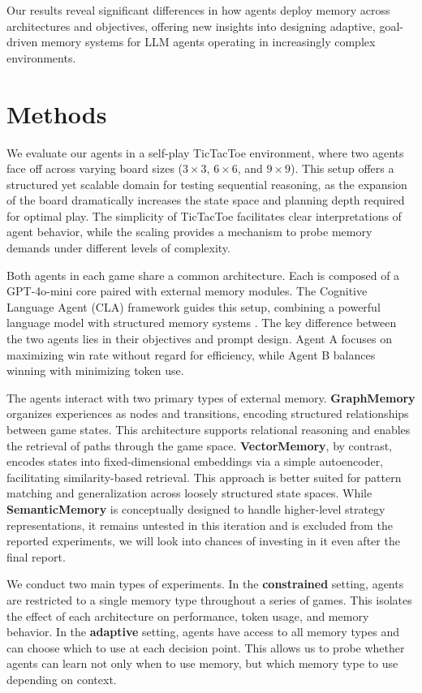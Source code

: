 \documentclass[10pt]{article}
\begin{document}
Our results reveal significant differences in how agents deploy memory across architectures and objectives, offering new insights into designing adaptive, goal-driven memory systems for LLM agents operating in increasingly complex environments.

\section{Methods}

We evaluate our agents in a self-play TicTacToe environment, where two agents face off across varying board sizes ($3 \times 3$, $6 \times 6$, and $9 \times 9$). This setup offers a structured yet scalable domain for testing sequential reasoning, as the expansion of the board dramatically increases the state space and planning depth required for optimal play. The simplicity of TicTacToe facilitates clear interpretations of agent behavior, while the scaling provides a mechanism to probe memory demands under different levels of complexity.

Both agents in each game share a common architecture. Each is composed of a GPT-4o-mini core paired with external memory modules. The Cognitive Language Agent (CLA) framework guides this setup, combining a powerful language model with structured memory systems \cite{sumers2024cognitivearchitectureslanguageagents}. The key difference between the two agents lies in their objectives and prompt design. Agent A focuses on maximizing win rate without regard for efficiency, while Agent B balances winning with minimizing token use.

The agents interact with two primary types of external memory. \textbf{GraphMemory} organizes experiences as nodes and transitions, encoding structured relationships between game states. This architecture supports relational reasoning and enables the retrieval of paths through the game space. \textbf{VectorMemory}, by contrast, encodes states into fixed-dimensional embeddings via a simple autoencoder, facilitating similarity-based retrieval. This approach is better suited for pattern matching and generalization across loosely structured state spaces. While \textbf{SemanticMemory} is conceptually designed to handle higher-level strategy representations, it remains untested in this iteration and is excluded from the reported experiments, we will look into chances of investing in it even after the final report.

We conduct two main types of experiments. In the \textbf{constrained} setting, agents are restricted to a single memory type throughout a series of games. This isolates the effect of each architecture on performance, token usage, and memory behavior. In the \textbf{adaptive} setting, agents have access to all memory types and can choose which to use at each decision point. This allows us to probe whether agents can learn not only when to use memory, but which memory type to use depending on context.
\end{document}
